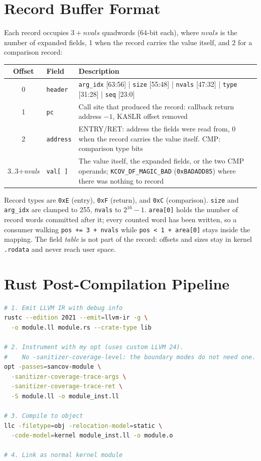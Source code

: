 \documentclass{article}
\begin{document}
\section{Record Buffer Format}\label{app:ringbuf}

Each record occupies $3 + \mathit{nvals}$ quadwords (64-bit each), where
$\mathit{nvals}$ is the number of expanded fields, 1 when the record carries
the value itself, and 2 for a comparison record:

\begin{center}
\small
\begin{tabular}{|c|l|p{10.0cm}|}
\hline
\textbf{Offset} & \textbf{Field} & \textbf{Description} \\
\hline
0 & \texttt{header} & \texttt{arg\_idx} [63:56] | \texttt{size} [55:48] | \texttt{nvals} [47:32] | \texttt{type} [31:28] | \texttt{seq} [23:0] \\
1 & \texttt{pc} & Call site that produced the record: callback return address $-1$, KASLR offset removed \\
2 & \texttt{address} & ENTRY/RET: address the fields were read from, 0 when the record carries the value itself. CMP: comparison type bits \\
3..3+\textit{nvals} & \texttt{val[\,]} & The value itself, the expanded fields, or the two CMP operands; \texttt{KCOV\_DF\_MAGIC\_BAD} (\texttt{0xBADADD85}) where there was nothing to record \\
\hline
\end{tabular}
\end{center}

\noindent Record types are \texttt{0xE} (entry), \texttt{0xF} (return), and
\texttt{0xC} (comparison). \texttt{size} and \texttt{arg\_idx} are clamped to
255, \texttt{nvals} to $2^{16}-1$. \texttt{area[0]} holds the number of record
words committed after it; every counted word has been written, so a consumer
walking \texttt{pos += 3 + nvals} while \texttt{pos < 1 + area[0]} stays inside
the mapping. The field \emph{table} is not part of the record: offsets and
sizes stay in kernel \texttt{.rodata} and never reach user space.

\section{Rust Post-Compilation Pipeline}\label{app:rust}

\begin{lstlisting}[language=bash,caption={Rust module instrumentation pipeline}]
# 1. Emit LLVM IR with debug info
rustc --edition 2021 --emit=llvm-ir -g \
  -o module.ll module.rs --crate-type lib

# 2. Instrument with my opt (uses custom LLVM 24).
#    No -sanitizer-coverage-level: the boundary modes do not need one.
opt -passes=sancov-module \
  -sanitizer-coverage-trace-args \
  -sanitizer-coverage-trace-ret \
  -S module.ll -o module_inst.ll

# 3. Compile to object
llc -filetype=obj -relocation-model=static \
  -code-model=kernel module_inst.ll -o module.o

# 4. Link as normal kernel module
\end{lstlisting}
\end{document}
